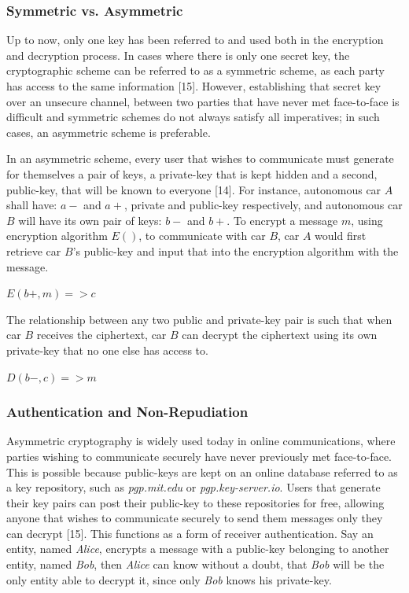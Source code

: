 \documentclass[conference,compsoc]{IEEEtran}
\begin{document}
\subsubsection{Symmetric vs. Asymmetric}
Up to now, only one key has been referred to and used both in the encryption and decryption process. In cases where there is only one secret key, the cryptographic scheme can be referred to as a symmetric scheme, as each party has access to the same information [15]. However, establishing that secret key over an unsecure channel, between two parties that have never met face-to-face is difficult and symmetric schemes do not always satisfy all imperatives; in such cases, an asymmetric scheme is preferable.

In an asymmetric scheme, every user that wishes to communicate must generate for themselves a pair of keys, a private-key that is kept hidden and a second, public-key, that will be known to everyone [14]. For instance, autonomous car $A$ shall have: $a-$ and $a+$, private and public-key respectively, and autonomous car $B$ will have its own pair of keys: $b-$ and $b+$. To encrypt a message $m$, using encryption algorithm $E()$, to communicate with car $B$, car $A$ would first retrieve car $B$'s public-key and input that into the encryption algorithm with the message.\\

\begin{center}
\large $E(b+, m) => c$ 
\break
\end{center}

The relationship between any two public and private-key pair is such that when car $B$ receives the ciphertext, car $B$ can decrypt the ciphertext using its own private-key that no one else has access to.\\

\begin{center}
\large $D(b-, c) => m$
\end{center}


\subsubsection{Authentication and Non-Repudiation}
Asymmetric cryptography is widely used today in online communications, where parties wishing to communicate securely have never previously met face-to-face. This is possible because public-keys are kept on an online database referred to as a key repository, such as \emph{pgp.mit.edu} or \emph{pgp.key-server.io}. Users that generate their key pairs can post their public-key to these repositories for free, allowing anyone that wishes to communicate securely to send them messages only they can decrypt [15]. This functions as a form of receiver authentication. Say an entity, named \emph{Alice}, encrypts a message with a public-key belonging to another entity, named \emph{Bob}, then \emph{Alice} can know without a doubt, that \emph{Bob} will be the only entity able to decrypt it, since only \emph{Bob} knows his private-key. 
\end{document}

